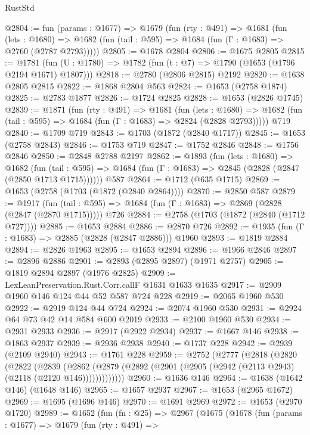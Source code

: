 \begin{lexlean}{RustStd}
\begin{coremodule}
{\begin{coremodule}
{{{{{{{{{{{{{{{{@2804 := fun (params : @1677) =>
  @1679
    (fun (rty : @491) =>
    @1681
      (fun (lets : @1680) =>
      @1682 (fun (tail : @595) => @1684 (fun (Γ : @1683) => @2760 (@2787 @2793)))))
@2805 := @1678 @2804
@2806 := @1675 @2805
@2815 := @1781 (fun (U : @1780) => @1782 (fun (t : @7) => @1790 (@1653 (@1796 @2194 @1671) @1807)))
@2818 := @2780 (@2806 @2815) @2192
@2820 := @1638 @2805 @2815
@2822 := @1868 @2804 @563
@2824 := @1653 (@2758 @1874)
@2825 := @2783 @1877
@2826 := @1724 @2825
@2828 := @1653 (@2826 @1745)
@2839 := @1871
    (fun (rty : @491) =>
    @1681
      (fun (lets : @1680) =>
      @1682 (fun (tail : @595) => @1684 (fun (Γ : @1683) => @2824 (@2828 @2793)))))
    @719
@2840 := @1709 @719
@2843 := @1703 (@1872 (@2840 @1717))
@2845 := @1653 (@2758 @2843)
@2846 := @1753 @719
@2847 := @1752 @2846
@2848 := @1756 @2846
@2850 := @2848 @2788 @2197
@2862 := @1893
    (fun (lets : @1680) =>
    @1682
      (fun (tail : @595) => @1684 (fun (Γ : @1683) => @2845 (@2828 (@2847 (@2850 @1713 @1715))))))
    @587
@2864 := @1712 (@635 @1715)
@2869 := @1653 (@2758 (@1703 (@1872 (@2840 @2864))))
@2870 := @2850 @587
@2879 := @1917
    (fun (tail : @595) => @1684 (fun (Γ : @1683) => @2869 (@2828 (@2847 (@2870 @1715)))))
    @726
@2884 := @2758 (@1703 (@1872 (@2840 (@1712 @727))))
@2885 := @1653 @2884
@2886 := @2870 @726
@2892 := @1935 (fun (Γ : @1683) => @2885 (@2828 (@2847 @2886))) @1960
@2893 := @1819 @2884
@2894 := @2826 @1963
@2895 := @1653 @2894
@2896 := @1966 @2846
@2897 := @2896 @2886
@2901 := @2893 (@2895 @2897) (@1971 @2757)
@2905 := @1819 @2894 @2897 (@1976 @2825)
@2909 := LexLeanPreservation.Rust.Corr.callF @1631 @1633 @1635
@2917 := @2909 @1960 @146 @124 @44 @52 @587 @724 @228
@2919 := @2065 @1960 @530
@2922 := @2919 @124 @44 @724
@2924 := @2074 @1960 @530
@2931 := @2924 @64 @73 @42 @14 @584 @600 @2019
@2933 := @2100 @1960 @530
@2934 := @2931 @2933
@2936 := @2917 (@2922 @2934)
@2937 := @1667 @146
@2938 := @1863 @2937
@2939 := @2936 @2938
@2940 := @1737 @228
@2942 := @2939 (@2109 @2940)
@2943 := @1761 @228
@2959 := @2752
    (@2777
      (@2818
        (@2820
          (@2822
            (@2839
              (@2862
                (@2879 (@2892 (@2901 (@2905 (@2942 (@2113 @2943) (@2118 (@2120 @146)))))))))))))
@2960 := @1636 @146
@2964 := @1638 (@1642 @146) (@1648 @146)
@2965 := @1657 @2937
@2967 := @1653 (@2965 @1672)
@2969 := @1695 (@1696 @146)
@2970 := @1691 @2969
@2972 := @1653 (@2970 @1720)
@2989 := @1652
    (fun (fn : @25) =>
    @2967
      (@1675
        (@1678
          (fun (params : @1677) =>
          @1679
            (fun (rty : @491) =>
}}}}}}}}}}}}}}}}
\end{coremodule}}
\end{coremodule}
\end{lexlean}
